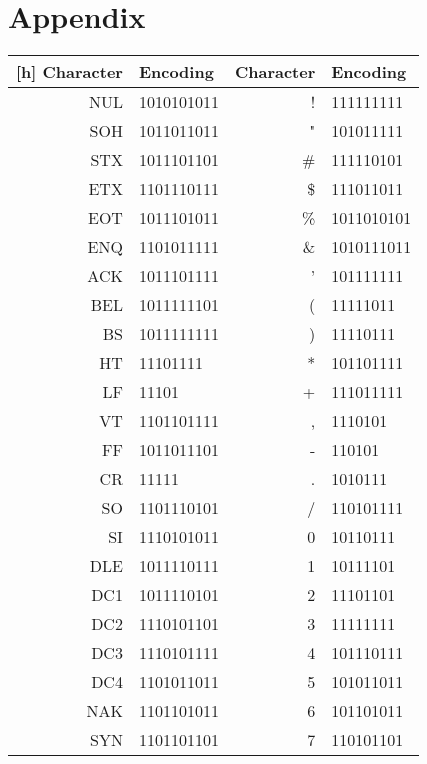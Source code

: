 \chapter{Appendix}\label{ch:Appendix}
\glsresetall %

\begin{longtable}{ r l || r l }[h]
	Character & Encoding & Character & Encoding \\\hline
	NUL & 1010101011 				&	!   & 111111111  \\
	SOH & 1011011011 				&	"   & 101011111  \\
	STX & 1011101101 				&	\#  & 111110101  \\
	ETX & 1101110111 				&	\$  & 111011011  \\
	EOT & 1011101011 				&	\%  & 1011010101  \\
	ENQ & 1101011111 				&	\&  & 1010111011  \\
	ACK & 1011101111 				&	'   & 101111111  \\
	BEL & 1011111101 				&	(   & 11111011  \\
	BS  & 1011111111 				&	)   & 11110111  \\
	HT  & 11101111 					&	*   & 101101111  \\
	LF  & 11101 					&	+   & 111011111  \\
	VT  & 1101101111 				&	,   & 1110101  \\
	FF  & 1011011101 				&	-   & 110101  \\
	CR  & 11111 					&	.   & 1010111  \\
	SO  & 1101110101 				&	/   & 110101111  \\
	SI  & 1110101011 				&	0   & 10110111  \\
	DLE & 1011110111 				&	1   & 10111101  \\
	DC1 & 1011110101 				&	2   & 11101101  \\
	DC2 & 1110101101 				&	3   & 11111111  \\
	DC3 & 1110101111 				&	4   & 101110111  \\
	DC4 & 1101011011 				&	5   & 101011011  \\
	NAK & 1101101011 				&	6   & 101101011  \\
	SYN & 1101101101 				&	7   & 110101101  \\

\end{longtable}
